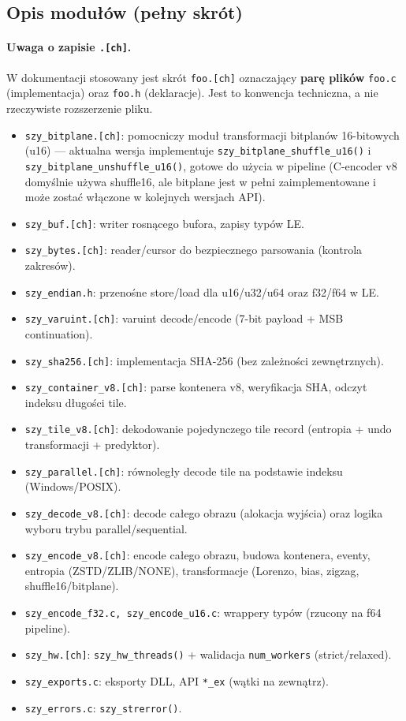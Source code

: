 \documentclass[11pt,a4paper]{article}
\begin{document}
\subsection{Opis modułów (pełny skrót)}
\label{subsec:modules_full_short}
\paragraph{Uwaga o zapisie \texttt{.[ch]}.}
W dokumentacji stosowany jest skrót \texttt{foo.[ch]} oznaczający \textbf{parę plików} \texttt{foo.c} (implementacja) oraz \texttt{foo.h} (deklaracje). Jest to konwencja techniczna, a nie rzeczywiste rozszerzenie pliku.

\begin{itemize}
  \item \texttt{szy\_bitplane.[ch]}: pomocniczy moduł transformacji bitplanów 16-bitowych (u16) --- aktualna wersja implementuje \texttt{szy\_bitplane\_shuffle\_u16()} i \texttt{szy\_bitplane\_unshuffle\_u16()}, gotowe do użycia w pipeline (C-encoder v8 domyślnie używa shuffle16, ale bitplane jest w pełni zaimplementowane i może zostać włączone w kolejnych wersjach API).
  \item \texttt{szy\_buf.[ch]}: writer rosnącego bufora, zapisy typów LE.
  \item \texttt{szy\_bytes.[ch]}: reader/cursor do bezpiecznego parsowania (kontrola zakresów).
  \item \texttt{szy\_endian.h}: przenośne store/load dla u16/u32/u64 oraz f32/f64 w LE.
  \item \texttt{szy\_varuint.[ch]}: varuint decode/encode (7-bit payload + MSB continuation).
  \item \texttt{szy\_sha256.[ch]}: implementacja SHA-256 (bez zależności zewnętrznych).
  \item \texttt{szy\_container\_v8.[ch]}: parse kontenera v8, weryfikacja SHA, odczyt indeksu długości tile.
  \item \texttt{szy\_tile\_v8.[ch]}: dekodowanie pojedynczego tile record (entropia + undo transformacji + predyktor).
  \item \texttt{szy\_parallel.[ch]}: równoległy decode tile na podstawie indeksu (Windows/POSIX).
  \item \texttt{szy\_decode\_v8.[ch]}: decode całego obrazu (alokacja wyjścia) oraz logika wyboru trybu parallel/sequential.
  \item \texttt{szy\_encode\_v8.[ch]}: encode całego obrazu, budowa kontenera, eventy, entropia (ZSTD/ZLIB/NONE), transformacje (Lorenzo, bias, zigzag, shuffle16/bitplane).
  \item \texttt{szy\_encode\_f32.c, szy\_encode\_u16.c}: wrappery typów (rzucony na f64 pipeline).
  \item \texttt{szy\_hw.[ch]}: \texttt{szy\_hw\_threads()} + walidacja \texttt{num\_workers} (strict/relaxed).
  \item \texttt{szy\_exports.c}: eksporty DLL, API \texttt{*\_ex} (wątki na zewnątrz).
  \item \texttt{szy\_errors.c}: \texttt{szy\_strerror()}.
\end{itemize}
\end{document}
